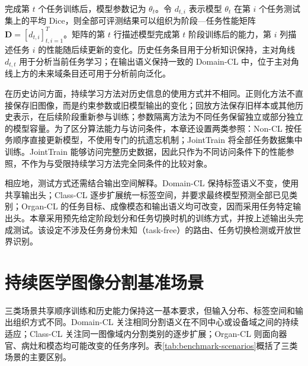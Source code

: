 完成第 $t$ 个任务训练后，模型参数记为 $\theta_t$。令 $d_{t,i}$ 表示模型 $\theta_t$ 在第 $i$ 个任务测试集上的平均 Dice，则全部可评测结果可以组织为阶段—任务性能矩阵
$\mathbf{D}=[d_{t,i}]_{t,i=1}^{T}$。矩阵的第 $t$ 行描述模型完成第 $t$ 阶段训练后的能力，第 $i$ 列描述任务 $i$ 的性能随后续更新的变化。历史任务条目用于分析知识保持，主对角线 $d_{t,t}$ 用于分析当前任务学习；在输出语义保持一致的 Domain-CL 中，位于主对角线上方的未来域条目还可用于分析前向泛化。

在历史访问方面，持续学习方法对历史信息的使用方式并不相同。正则化方法不直接保存旧图像，而是约束参数或旧模型输出的变化；回放方法保存旧样本或其他历史表示，在后续阶段重新参与训练；参数隔离方法为不同任务保留独立或部分独立的模型容量。为了区分算法能力与访问条件，本章还设置两类参照：Non-CL 按任务顺序直接更新模型，不使用专门的抗遗忘机制；JointTrain 将全部任务数据集中训练。JointTrain 能够访问完整历史数据，因此只作为不同访问条件下的性能参照，不作为与受限持续学习方法完全同条件的比较对象。

相应地，测试方式还需结合输出空间解释。Domain-CL 保持标签语义不变，使用共享输出头；Class-CL 逐步扩展统一标签空间，并要求最终模型预测全部已见类别；Organ-CL 的任务目标、成像模态和输出语义均可改变，因而采用任务特定输出头。本章采用预先给定阶段划分和任务切换时机的训练方式，并按上述输出头完成测试。该设定不涉及任务身份未知（task-free）的路由、任务切换检测或开放世界识别。


\section{持续医学图像分割基准场景}
\label{sec:benchmark-scenarios}

三类场景共享顺序训练和历史能力保持这一基本要求，但输入分布、标签空间和输出组织方式不同。Domain-CL 关注相同分割语义在不同中心或设备域之间的持续适应；Class-CL 关注同一图像域内分割类别的逐步扩展；Organ-CL 则面向器官、病灶和模态均可能改变的任务序列。表\ref{tab:benchmark-scenarios}概括了三类场景的主要区别。

